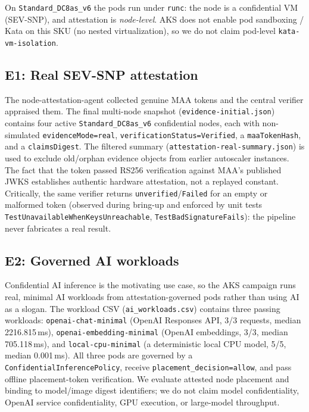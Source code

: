 \noindent On \texttt{Standard\_DC8as\_v6} the pods run under \texttt{runc}: the
node is a confidential VM (SEV-SNP), and attestation is \emph{node-level}. AKS
does not enable pod sandboxing / Kata on this SKU (no nested virtualization), so
we do not claim pod-level \texttt{kata-vm-isolation}.

\subsection{E1: Real SEV-SNP attestation}
The node-attestation-agent collected genuine MAA tokens and the central verifier
appraised them. The final multi-node snapshot
(\texttt{evidence-initial.json}) contains four active
\texttt{Standard\_DC8as\_v6} confidential nodes, each with non-simulated
\texttt{evidenceMode=real}, \texttt{verificationStatus=Verified}, a
\texttt{maaTokenHash}, and a \texttt{claimsDigest}. The filtered summary
(\texttt{attestation-real-summary.json}) is used to exclude old/orphan evidence
objects from earlier autoscaler instances. The fact that the token passed RS256
verification against MAA's published JWKS establishes authentic hardware
attestation, not a replayed constant. Critically, the same verifier returns
\texttt{unverified}/\texttt{Failed} for an empty or malformed token (observed
during bring-up and enforced by unit tests
\texttt{TestUnavailableWhenKeysUnreachable}, \texttt{TestBadSignatureFails}):
the pipeline never fabricates a real result.

\subsection{E2: Governed AI workloads}
\label{sec:e2-ai}
Confidential AI inference is the motivating use case, so the AKS campaign runs
real, minimal AI workloads from attestation-governed pods rather than using AI as
a slogan. The workload CSV (\texttt{ai\_workloads.csv}) contains three passing
workloads: \texttt{openai-chat-minimal} (OpenAI Responses API, 3/3 requests,
median 2216.815\,ms), \texttt{openai-embedding-minimal} (OpenAI embeddings, 3/3,
median 705.118\,ms), and \texttt{local-cpu-minimal} (a deterministic local CPU
model, 5/5, median 0.001\,ms). All three pods are governed by a
\texttt{ConfidentialInferencePolicy}, receive \texttt{placement\_decision=allow},
and pass offline placement-token verification. We evaluate attested node
placement and binding to model/image digest identifiers; we do not claim model
confidentiality, OpenAI service confidentiality, GPU execution, or large-model
throughput.

